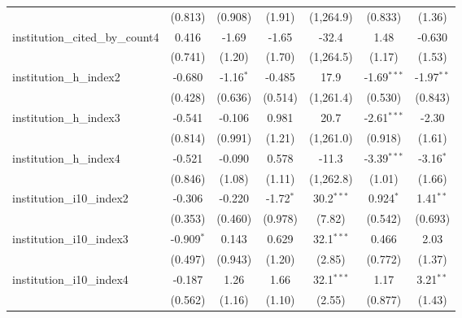 \begin{tabular}{lcccccc}
                                         & (0.813)       & (0.908)      & (1.91)        & (1,264.9)     & (0.833)       & (1.36)\\   
   institution\_cited\_by\_count4        & 0.416         & -1.69        & -1.65         & -32.4         & 1.48          & -0.630\\   
                                         & (0.741)       & (1.20)       & (1.70)        & (1,264.5)     & (1.17)        & (1.53)\\   
   institution\_h\_index2                & -0.680        & -1.16$^{*}$  & -0.485        & 17.9          & -1.69$^{***}$ & -1.97$^{**}$\\   
                                         & (0.428)       & (0.636)      & (0.514)       & (1,261.4)     & (0.530)       & (0.843)\\   
   institution\_h\_index3                & -0.541        & -0.106       & 0.981         & 20.7          & -2.61$^{***}$ & -2.30\\   
                                         & (0.814)       & (0.991)      & (1.21)        & (1,261.0)     & (0.918)       & (1.61)\\   
   institution\_h\_index4                & -0.521        & -0.090       & 0.578         & -11.3         & -3.39$^{***}$ & -3.16$^{*}$\\   
                                         & (0.846)       & (1.08)       & (1.11)        & (1,262.8)     & (1.01)        & (1.66)\\   
   institution\_i10\_index2              & -0.306        & -0.220       & -1.72$^{*}$   & 30.2$^{***}$  & 0.924$^{*}$   & 1.41$^{**}$\\   
                                         & (0.353)       & (0.460)      & (0.978)       & (7.82)        & (0.542)       & (0.693)\\   
   institution\_i10\_index3              & -0.909$^{*}$  & 0.143        & 0.629         & 32.1$^{***}$  & 0.466         & 2.03\\   
                                         & (0.497)       & (0.943)      & (1.20)        & (2.85)        & (0.772)       & (1.37)\\   
   institution\_i10\_index4              & -0.187        & 1.26         & 1.66          & 32.1$^{***}$  & 1.17          & 3.21$^{**}$\\   
                                         & (0.562)       & (1.16)       & (1.10)        & (2.55)        & (0.877)       & (1.43)\\   

\end{tabular}
